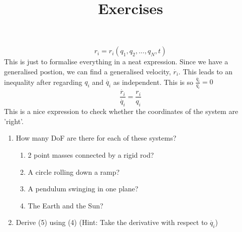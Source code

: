 \begin{equation}
r_{i} = r_{i}(q_{1}, q_{2}, ..., q_{N}, t)
\end{equation}
This is just to formalise everything in a neat expression. Since we have a generalised postion, we can find a generalised velocity, $\dot{r_{i}}$. This leads to an inequality after regarding $q_{i}$ and $\dot{q_{i}}$ as independent. This is so $\frac{\dot{q_{i}}}{q_{i}} =  0$
\begin{equation}
 \frac{\dot{r_{i}}}{\dot{q_{i}}} =  \frac{r_{i}}{q_{i}} 
\end{equation}
This is a nice expression to check whether the coordinates of the system are 'right'.
\par


 

\title{\large{Exercises}}
\begin{enumerate}
	\item How many DoF are there for each of these systems?
	\begin{enumerate}
		\item 2 point masses connected by a rigid rod? 
		\item A circle rolling down a ramp?
		\item A pendulum swinging in one plane?
		\item The Earth and the Sun? 
	\end{enumerate}
	\item Derive (5) using (4) (Hint: Take the derivative with respect to $\dot{q_{i}}$)

\end{enumerate}


